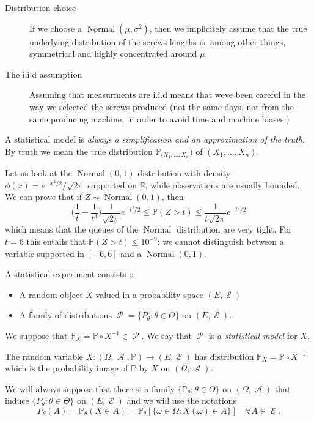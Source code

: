 \documentclass[
	fontsize=11pt, %
	twoside=false, %
	numbers=noenddot, %
]{kaobook}
\DeclareMathOperator{\cA}{\mathcal A}
\DeclareMathOperator{\cE}{\mathcal E}
\DeclareMathOperator{\cP}{\mathcal P}
\DeclareMathOperator{\nor}{Normal}
\renewcommand{\P}{\mathbb P}
\newcommand{\R}{\mathbb R}
\begin{document}
\begin{description}
	\item[Distribution choice] If we choose a $\nor(\mu, \sigma^2)$, then we implicitely assume that the true underlying distribution of the screws lengths is, among other things, symmetrical and highly concentrated around $\mu$.
	\item[The i.i.d assumption] Assuming that measurments are i.i.d means that weve been careful in the way we selected the screws produced (not the same days, not from the same producing machine, in order to avoid time and machine biases.)
\end{description}

A statistical model is \emph{always a simplification and an approximation of the truth}.
By truth we mean the true distribution $\P_{(X_1, \ldots, X_n})$ of $(X_1, \ldots, X_n)$.

Let us look at the $\nor(0, 1)$ distribution with density $\phi(x) = e^{-x^2/2} / \sqrt{2 \pi}$ supported on $\R$, while observations are usually bounded.
We can prove that if $Z \sim \nor(0, 1)$, then
\begin{equation*}
	\Big( \frac 1t - \frac{1}{t^3} \Big) \frac{1}{\sqrt{2\pi}} e^{-t^2 / 2} \leq \P(Z > t) \leq \frac{1}{t \sqrt{2 \pi}} e^{-t^2 / 2}
\end{equation*}
which means that the queues of the $\nor$ distribution are very tight.
For $t=6$ this entails that $\P(Z > t) \leq 10^{-9}$: we cannot distinguish between a variable supported in $[-6, 6]$ and a $\nor(0, 1)$.

\begin{definition}
	A statistical experiment consists o
	\begin{itemize}
		\item A random object $X$ valued in a probability space $(E, \cE)$
		\item A family of distributions $\cP = \{ P_\theta : \theta \in \Theta\}$ on $(E, \cE)$.
	\end{itemize}
	We suppose that $\P_X = \P \circ X^{-1} \in \cP$. We say that $\cP$ is a \emph{statistical model} for $X$.
\end{definition}
The random variable $X : (\Omega, \cA, \P) \rightarrow (E, \cE)$ has distribution  $\P_X = \P \circ X^{-1}$ which is the probability image of $\P$ by $X$ on $(\Omega, \cA)$.

We will always suppose that there is a family $\{ \P_\theta : \theta \in \Theta\}$ on $(\Omega, \cA)$ that induce $\{ P_\theta : \theta \in \Theta\}$ on $(E, \cE)$ and we will use the notations
\begin{equation*}
	P_\theta(A) = \P_\theta(X \in A) = \P_\theta[ \{ \omega \in \Omega : X(\omega) \in A \}] \quad \forall A \in \cE.
\end{equation*}
\end{document}
